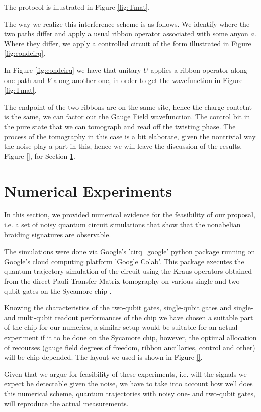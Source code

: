 \documentclass[two column]{article}
\begin{document}
The protocol is illustrated in Figure \ref{fig:Tmat}.

The way we realize this interference scheme is as follows.
We identify where the two paths differ and apply a usual ribbon operator associated with some anyon $a$. Where they differ, we apply a controlled circuit of the form illustrated in Figure \ref{fig:condcirq}.

In Figure \ref{fig:condcirq} we have that unitary $U$ applies a ribbon operator along one path and $V$ along another one, in order to get the wavefunction in Figure \ref{fig:Tmat}.

The endpoint of the two ribbons are on the same site, hence the charge contetnt is the same, we can factor out the Gauge Field wavefunction. 
The control bit in the pure state that we can tomograph and read off the twisting phase.
The process of the tomography in this case is a bit elaborate, given the nontrivial way the noise play a part in this, hence we will leave the discussion of the results, Figure \ref{}, for Section \ref{sec:num}.

\section{Numerical Experiments}\label{sec:num}

In this section, we provided numerical evidence for the feasibility of our proposal, i.e. a set of noisy quantum circuit simulations that show that the nonabelian braiding signatures are observable.

The simulations were done via Google's 'cirq\_google' python package running on Google's cloud computing platform 'Google Colab'. This package executes the quantum trajectory simulation of the circuit using the Kraus operators obtained from the direct Pauli Transfer Matrix tomography on various single and two qubit gates on the Sycamore chip \cite{}.

Knowing the characteristics of the two-qubit gates, single-qubit gates and single- and multi-qubit readout performances of the chip \cite{} we have chosen a suitable part of the chip for our numerics, a similar setup would be suitable for an actual experiment if it to be done on the Sycamore chip, however, the optimal allocation of recourses (gauge field degrees of freedom, ribbon ancillaries, control and other) will be chip depended. The layout we used is shown in Figure \ref{}.

Given that we argue for feasibility of these experiments, i.e. will the signals we expect be detectable given the noise, we have to take into account how well does this numerical scheme, quantum trajectories with noisy one- and two-qubit gates, will reproduce the actual measurements.
\end{document}
